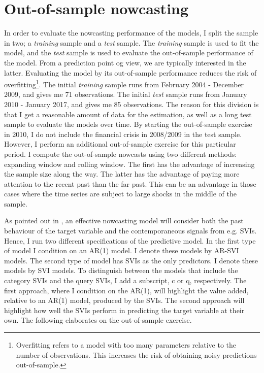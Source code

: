 \section{Out-of-sample nowcasting}\label{out_of_sample}

In order to evaluate the nowcasting performance of the models, I split the sample in two; a \textit{training} sample and a \textit{test} sample. The \textit{training} sample is used to fit the model, and the \textit{test} sample is used to evaluate the out-of-sample performance of the model. From a prediction point og view, we are typically interested in the latter. Evaluating the model by its out-of-sample performance reduces the risk of overfitting\footnote{Overfitting refers to a model with too many parameters relative to the number of observations. This increases the risk of obtaining noisy predictions out-of-sample.}. The initial \textit{training} sample runs from February 2004 - December 2009, and gives me 71 observations. The initial \textit{test} sample runs from January 2010 - January 2017, and gives me 85 observations. The reason for this division is that I get a reasonable amount of data for the estimation, as well as a long test sample to evaluate the models over time. By starting the out-of-sample exercise in 2010, I do not include the financial crisis in 2008/2009 in the test sample. However, I perform an additional out-of-sample exercise for this particular period. I compute the out-of-sample nowcasts using two different methods: expanding window and rolling window. The first has the advantage of increasing the sample size along the way. The latter has the advantage of paying more attention to the recent past than the far past. This can be an advantage in those cases where the time series are subject to large shocks in the middle of the sample.

As pointed out in \textcite{scott2014}, an effective nowcasting model will consider both the past behaviour of the target variable and the contemporaneous signals from e.g. SVIs. Hence, I run two different specifications of the predictive model. In the first type of model I condition on an AR(1) model. I denote these models by AR-SVI models. The second type of model has SVIs as the only predictors. I denote these models by SVI models. To distinguish between the models that include the category SVIs and the query SVIs, I add a subscript, c or q, respectively. The first approach, where I condition on the AR(1), will highlight the value added, relative to an AR(1) model, produced by the SVIs. The second approach will highlight how well the SVIs perform in predicting the target variable at their own. The following elaborates on the out-of-sample exercise.



